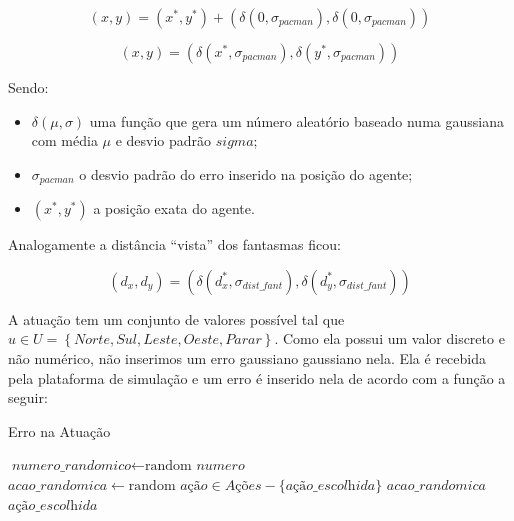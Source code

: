 $$
	\left( x, y \right) = \left( x^*, y^* \right) + \left( \delta\left( 0, \sigma_{pacman} \right), \delta\left( 0, \sigma_{pacman} \right) \right)
$$

\begin{equation}
	\left( x, y \right) = \left( \delta\left( x^*, \sigma_{pacman} \right), \delta\left( y^*, \sigma_{pacman} \right) \right)
\end{equation}

Sendo:

\begin{itemize}
	\item $ \delta \left( \mu, \sigma \right) $ uma função que gera um número aleatório baseado numa gaussiana com média $ \mu $ e desvio padrão $ 
sigma $;
	\item $ \sigma_{pacman} $ o desvio padrão do erro inserido na posição do agente;
	\item $ \left( x^*, y^* \right) $ a posição exata do agente.
\end{itemize}

Analogamente a distância ``vista'' dos fantasmas ficou:

\begin{equation}
	\left( d_x, d_y \right) = \left( \delta\left( d_x^*, \sigma_{dist\_fant} \right), \delta\left( d_y^*, \sigma_{dist\_fant} \right) \right)
\end{equation}

A atuação tem um conjunto de valores possível tal que $ u \in U = \left\{ Norte, Sul, Leste, Oeste, Parar \right\} $. Como ela possui um valor discreto e não numérico, não inserimos um erro gaussiano gaussiano nela. Ela é recebida pela plataforma de simulação e um erro é inserido nela de acordo com a função a seguir:

\begin{algorithm}[H]
	\caption{Erro na Atuação} \label{algorithm:ErroAtuacao}
	\begin{algorithmic}[1]
			\State $\textit{numero\_randomico} \gets \text{random }\textit{numero}$
				\State $\textit{acao\_randomica} \gets \text{random }\textit{ação} \in \textit{Ações}-\textit{\{ação\_escolhida\}}$
				\State \Return $\textit{acao\_randomica}$
			\Else
				\State \Return $\textit{ação\_escolhida}$
			\EndIf
		\EndProcedure
	\end{algorithmic}
\end{algorithm}

